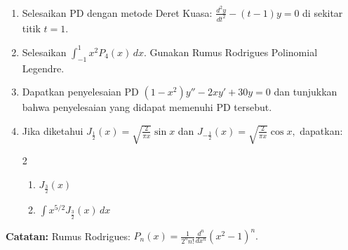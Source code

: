 \documentclass[11pt,letterpaper]{article}
\begin{document}
\begin{enumerate}[leftmargin=*, itemsep=0.35cm]
  \item Selesaikan PD dengan metode Deret Kuasa:
        $\displaystyle
          \frac{d^2y}{dt^2}-(t-1)y=0
        $
        di sekitar titik $t=1$.

  \item Selesaikan
        $\displaystyle
          \int_{-1}^{1} x^2P_4(x)\,dx.
        $
        Gunakan Rumus Rodrigues Polinomial Legendre.

  \item Dapatkan penyelesaian PD
        $\displaystyle
          (1-x^2)y''-2xy'+30y=0
        $
        dan tunjukkan bahwa penyelesaian yang didapat memenuhi PD tersebut.

  \item Jika diketahui
        $
          J_{\frac{1}{2}}(x)=\sqrt{\frac{2}{\pi x}}\sin x
        $ dan $
          J_{-\frac{1}{2}}(x)=\sqrt{\frac{2}{\pi x}}\cos x,
        $
        dapatkan:
        \begin{multicols}{2}
          \begin{enumerate}[label=\alph*)]
            \item $J_{\frac{3}{2}}(x)$
            \item $\displaystyle \int x^{5/2}J_{\frac{3}{2}}(x)\,dx$
          \end{enumerate}
        \end{multicols}
\end{enumerate}

\noindent \textbf{Catatan:} Rumus Rodrigues:
$\displaystyle
  P_n(x)=\frac{1}{2^n n!}\frac{d^n}{dx^n}(x^2-1)^n.
$
\end{document}
